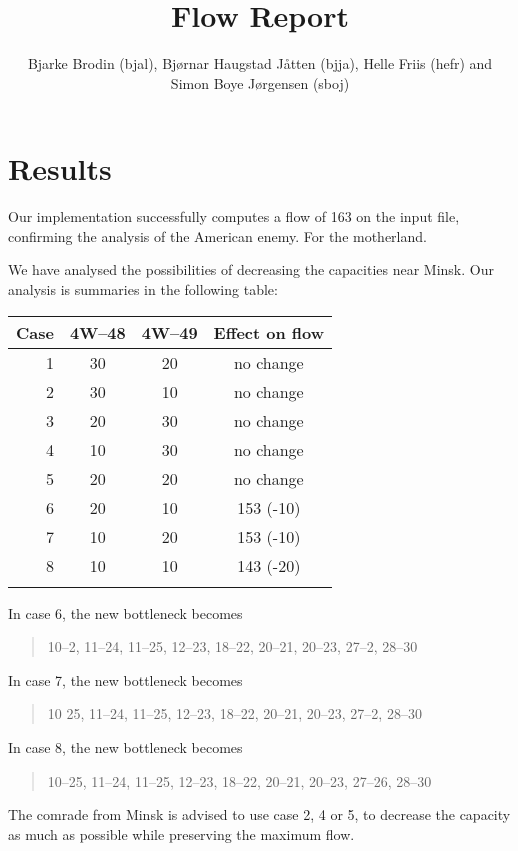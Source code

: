 \documentclass{tufte-handout}
\title{Flow Report}
\author{Bjarke Brodin (bjal), Bjørnar Haugstad Jåtten (bjja), Helle Friis (hefr) and Simon Boye Jørgensen (sboj)}
\begin{document}
  \maketitle

  \section{Results}

  Our implementation successfully computes a flow of 163 on the input file, confirming the analysis of the American enemy.
  For the motherland.

  We have analysed the possibilities of decreasing the capacities near Minsk.
  Our analysis is summaries in the following table:

\bigskip
  \begin{tabular}{rccc}\toprule
    Case & 4W--48 & 4W--49 & Effect on flow \\\midrule
    1& 30& 20 & no change \\
    2& 30& 10 & no change \\
    3& 20 &30 & no change \\
    4& 10 &30 & no change \\
    5& 20 & 20& no change \\
    6& 20 & 10& 153 (-10) \\
    7& 10 & 20& 153 (-10) \\
    8& 10 & 10& 143 (-20) \\
    \\\bottomrule
  \end{tabular}
  \bigskip

  In case 6, the new bottleneck becomes
  \begin{quote} 
    10--2, 11--24, 11--25, 12--23, 18--22, 20--21, 20--23, 27--2, 28--30    
  \end{quote}

  In case 7, the new bottleneck becomes
  \begin{quote}
    10 25, 11--24, 11--25, 12--23, 18--22, 20--21, 20--23, 27--2, 28--30
  \end{quote}

  In case 8, the new bottleneck becomes
  \begin{quote}
      10--25, 11--24, 11--25, 12--23, 18--22, 20--21, 20--23, 27--26, 28--30
  \end{quote}
  The comrade from Minsk is advised to use case 2, 4 or 5, 
  to decrease the capacity as much as possible while preserving the maximum flow.
\end{document}
